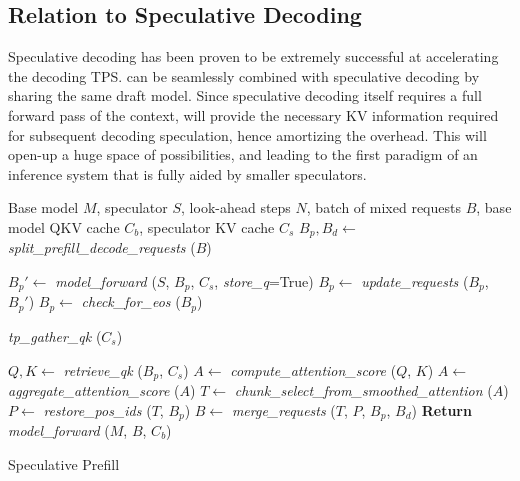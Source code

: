 \subsection{Relation to Speculative Decoding}
Speculative decoding has been proven to be extremely successful at accelerating the decoding TPS. \ours{} can be seamlessly combined with speculative decoding by sharing the same draft model. Since speculative decoding itself requires a full forward pass of the context, \ours{} will provide the necessary KV information required for subsequent decoding speculation, hence amortizing the overhead. This will open-up a huge space of possibilities, and leading to the first paradigm of an inference system that is fully aided by smaller speculators. 

\begin{algorithm}
\begin{algorithmic}[1]
\REQUIRE Base model $M$, speculator $S$, look-ahead steps $N$, batch of mixed requests $B$, base model QKV cache $C_b$, speculator KV cache $C_s$ 
\STATE $B_p, B_d \gets$ \textit{split\_prefill\_decode\_requests} ($B$)

\STATE {}
    \STATE $B_p' \gets$ \textit{model\_forward} ($S$, $B_p$, $C_s$, \textit{store\_q}=True)
    \STATE $B_p \gets$ \textit{update\_requests} ($B_p$, $B_p'$)
    \STATE $B_p \gets$ \textit{check\_for\_eos} ($B_p$)
\ENDFOR

    \STATE \textit{tp\_gather\_qk} ($C_s$)
\ENDIF

\STATE $Q, K \gets$ \textit{retrieve\_qk} ($B_p$, $C_s$)
\STATE $A \gets$ \textit{compute\_attention\_score} ($Q$, $K$)
\STATE {}
\STATE $A \gets$ \textit{aggregate\_attention\_score} ($A$) 
\STATE {}
\STATE $T \gets$ \textit{chunk\_select\_from\_smoothed\_attention} ($A$) 
\STATE {}
\STATE $P \gets$ \textit{restore\_pos\_ids} ($T$, $B_p$)
\STATE $B \gets$ \textit{merge\_requests} ($T$, $P$, $B_p$, $B_d$)
\STATE \textbf{Return} \textit{model\_forward} ($M$, $B$, $C_b$)
\end{algorithmic}
\caption{Speculative Prefill}
\label{algo:spec_prefill}
\end{algorithm}
